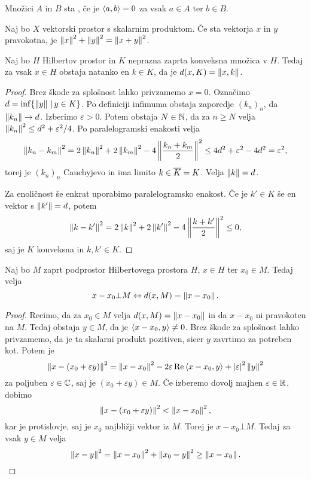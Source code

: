 \begin{definicija}
  Množici $A$ in $B$ sta , če je $\left< a,b \right> = 0$ za vsak $a \in
  A$ ter $b \in B$.
\end{definicija}

\begin{izrek}[Pitagora]
  Naj bo $X$ vektorski prostor s skalarnim produktom.
  Če sta vektorja $x$ in $y$ pravokotna, je $\left\lVert x\right\rVert^2 + \left\lVert y\right\rVert^2 =
  \left\lVert x+y\right\rVert^2$.
\end{izrek}

\begin{izrek}
  Naj bo $H$ Hilbertov prostor in $K$ neprazna zaprta konveksna množica v $H$.
  Tedaj za vsak $x \in H$ obstaja natanko en $k \in K$, da je $d(x,K) =
  \left\lVert x,k\right\rVert$.
\end{izrek}

\begin{proof}
  Brez škode za splošnost lahko privzamemo $x = 0$.
  Označimo $d = \inf \{\left\lVert y\right\rVert \,|\, y \in K\}$.
  Po definiciji infimuma obstaja zaporedje $(k_n)_n$, da $\left\lVert k_n\right\rVert \to d$.
  Izberimo $\varepsilon > 0$.
  Potem obstaja $N \in \mathbb{N}$, da za $n \ge N$ velja $\left\lVert k_n\right\rVert^2 \le d^2 +
  \varepsilon^2 /4$.
  Po paralelogramski enakosti velja
  \[
	\left\lVert k_n - k_m\right\rVert^2 = 2 \left\lVert k_n\right\rVert^2 + 2 \left\lVert k_m\right\rVert^2 - 4 \left\lVert\frac{k_n +
		k_m}{2}\right\rVert^2
	\le 4 d^2 + \varepsilon^2 - 4 d^2 = \varepsilon^2,
  \]
  torej je $(k_n)_n$ Cauchyjevo in ima limito $k \in \overline{K} = K$.
  Velja $\left\lVert k\right\rVert = d$.

  Za enoličnost še enkrat uporabimo paralelogramsko enakost.
  Če je $k' \in K$ še en vektor s $\left\lVert k'\right\rVert = d$, potem
  \[
	\left\lVert k-k'\right\rVert^2 = 2 \left\lVert k\right\rVert^2 + 2 \left\lVert k'\right\rVert^2 - 4 \left\lVert\frac{k+k'}{2}\right\rVert^2 \le 0,
  \]
  saj je $K$ konveksna in $k, k' \in K$.
\end{proof}

\begin{izrek}
  Naj bo $M$ zaprt podprostor Hilbertovega prostora $H$, $x \in H$ ter $x_0 \in
  M$.
  Tedaj velja
  \[
	x - x_0 \bot M \Leftrightarrow d(x,M) = \left\lVert x-x_0\right\rVert.
  \]
\end{izrek}

\begin{proof}
  Recimo, da za $x_0 \in M$ velja $d(x,M) = \left\lVert x-x_0\right\rVert$ in da $x - x_0$ ni
  pravokoten na $M$.
  Tedaj obstaja $y \in M$, da je $\left< x - x_0, y \right> \ne 0$.
  Brez škode za splošnost lahko privzamemo, da je ta skalarni produkt pozitiven,
  sicer $y$ zavrtimo za potreben kot.
  Potem je
  \[
	\left\lVert x - (x_0 + \varepsilon y)\right\rVert^2 = \left\lVert x - x_0\right\rVert^2 -
	2 \varepsilon \operatorname{Re} \left< x - x_0, y \right> + \left| \varepsilon \right|^2 \left\lVert y\right\rVert^2
  \]
  za poljuben $\varepsilon \in \mathbb{C}$, saj je $(x_0 + \varepsilon y) \in M$.
  Če izberemo dovolj majhen $\varepsilon \in \mathbb{R}$, dobimo
  \[
	\left\lVert x - (x_0 + \varepsilon y)\right\rVert^2 < \left\lVert x - x_0\right\rVert^2,
  \]
  kar je protislovje, saj je $x_0$ najbližji vektor iz $M$.
  Torej je $x - x_0 \bot M$.
  Tedaj za vsak $y \in M$ velja
  \[
	\left\lVert x-y\right\rVert^2 = \left\lVert x-x_0\right\rVert^2 + \left\lVert x_0 - y\right\rVert^2 \ge \left\lVert x - x_0\right\rVert.
	\qedhere
  \]
\end{proof}

